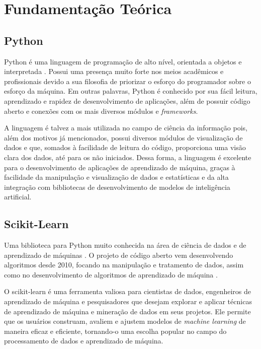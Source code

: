 \chapter{Fundamentação Teórica}
\label{fund_teo}

\section{Python}

Python é uma linguagem de programação de alto nível, orientada a objetos e interpretada \cite{van1995python}. Possui uma presença muito forte nos meios acadêmicos e profissionais devido a sua filosofia de priorizar o esforço do programador sobre o esforço da máquina. Em outras palavras, Python é conhecido por sua fácil leitura, aprendizado e rapidez de desenvolvimento de aplicações, além de possuir código aberto e conexões com os mais diversos módulos e \textit{frameworks}.

A linguagem é talvez a mais utilizada no campo de ciência da informação pois, além dos motivos já mencionados, possui diversos módulos de visualização de dados e que, somados à facilidade de leitura do código, proporciona uma visão clara dos dados, até para os não iniciados. Dessa forma, a linguagem é excelente para o desenvolvimento de aplicações de aprendizado de máquina, graças à facilidade da manipulação e visualização de dados e estatísticas e da alta integração com bibliotecas de desenvolvimento de modelos de inteligência artificial.

\section{Scikit-Learn}

Uma biblioteca para Python muito conhecida na área de ciência de dados e de aprendizado de máquinas \cite{sklearn_api}. O projeto de código aberto vem desenvolvendo algoritmos desde 2010, focando na manipulação e tratamento de dados, assim como no desenvolvimento de algoritmos de aprendizado de máquina \cite{scikit-learn}.

O scikit-learn é uma ferramenta valiosa para cientistas de dados, engenheiros de aprendizado de máquina e pesquisadores que desejam explorar e aplicar técnicas de aprendizado de máquina e mineração de dados em seus projetos. Ele permite que os usuários construam, avaliem e ajustem modelos de \textit{machine learning} de maneira eficaz e eficiente, tornando-o uma escolha popular no campo do processamento de dados e aprendizado de máquina.

